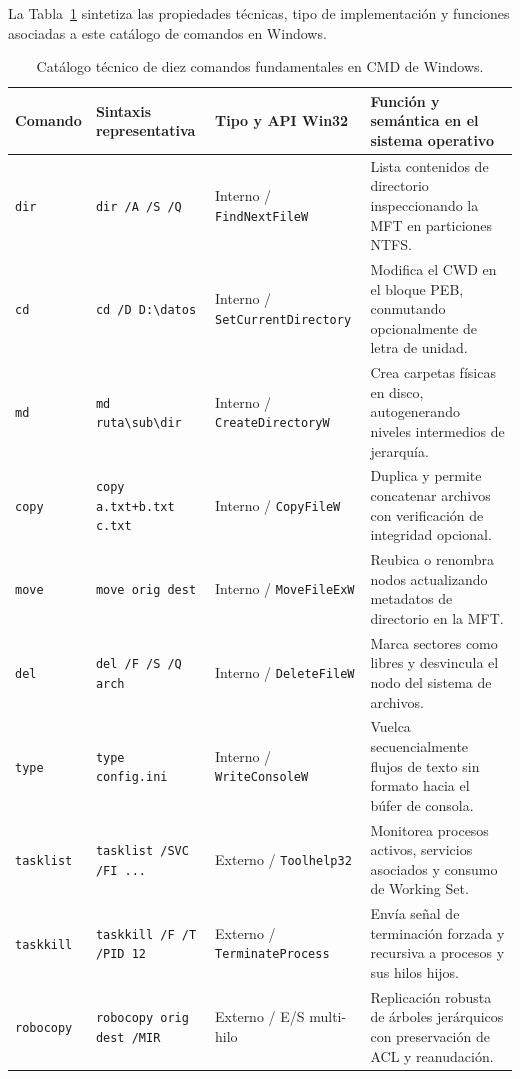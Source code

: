 \documentclass[12pt]{article}
\begin{document}
La Tabla~\ref{tab:catalogoComandosWindows} sintetiza las propiedades técnicas, tipo de implementación y funciones asociadas a este catálogo de comandos en Windows.

\begin{table}[htbp]
\centering
\footnotesize
\renewcommand{\arraystretch}{1.08}
\renewcommand{\tabularxcolumn}[1]{m{#1}}
\setlength{\emergencystretch}{1.5em}
\caption{Catálogo técnico de diez comandos fundamentales en CMD de Windows.}
\label{tab:catalogoComandosWindows}
\begin{tabularx}{\textwidth}{>{\centering\arraybackslash}m{2.0cm} >{\centering\arraybackslash}m{2.4cm} >{\centering\arraybackslash}m{2.4cm} X}
\toprule
\textbf{Comando} & \textbf{Sintaxis representativa} & \textbf{Tipo y API Win32} & \textbf{Función y semántica en el sistema operativo} \\
\midrule
\texttt{dir} & \texttt{dir /A /S /Q} & Interno / \texttt{FindNextFileW} & Lista contenidos de directorio inspeccionando la MFT en particiones NTFS. \\
\addlinespace
\texttt{cd} & \texttt{cd /D D:\textbackslash datos} & Interno / \texttt{SetCurrentDirectory} & Modifica el CWD en el bloque PEB, conmutando opcionalmente de letra de unidad. \\
\addlinespace
\texttt{md} & \texttt{md ruta\textbackslash sub\textbackslash dir} & Interno / \texttt{CreateDirectoryW} & Crea carpetas físicas en disco, autogenerando niveles intermedios de jerarquía. \\
\addlinespace
\texttt{copy} & \texttt{copy a.txt+b.txt c.txt} & Interno / \texttt{CopyFileW} & Duplica y permite concatenar archivos con verificación de integridad opcional. \\
\addlinespace
\texttt{move} & \texttt{move orig dest} & Interno / \texttt{MoveFileExW} & Reubica o renombra nodos actualizando metadatos de directorio en la MFT. \\
\addlinespace
\texttt{del} & \texttt{del /F /S /Q arch} & Interno / \texttt{DeleteFileW} & Marca sectores como libres y desvincula el nodo del sistema de archivos. \\
\addlinespace
\texttt{type} & \texttt{type config.ini} & Interno / \texttt{WriteConsoleW} & Vuelca secuencialmente flujos de texto sin formato hacia el búfer de consola. \\
\addlinespace
\texttt{tasklist} & \texttt{tasklist /SVC /FI ...} & Externo / \texttt{Toolhelp32} & Monitorea procesos activos, servicios asociados y consumo de Working Set. \\
\addlinespace
\texttt{taskkill} & \texttt{taskkill /F /T /PID 12} & Externo / \texttt{TerminateProcess} & Envía señal de terminación forzada y recursiva a procesos y sus hilos hijos. \\
\addlinespace
\texttt{robocopy} & \texttt{robocopy orig dest /MIR} & Externo / E/S multi-hilo & Replicación robusta de árboles jerárquicos con preservación de ACL y reanudación. \\
\bottomrule
\end{tabularx}
\end{table}
\end{document}
